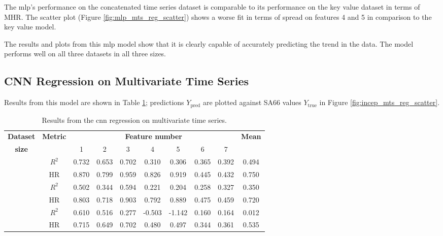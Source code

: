 The \ac{mlp}'s performance on the concatenated time series dataset is comparable to its performance on the key value dataset in terms of MHR. The scatter plot (Figure \ref{fig:mlp_mts_reg_scatter}) shows a worse fit in terms of spread on features 4 and 5 in comparison to the key value model.

The results and plots from this \ac{mlp} model show that it is clearly capable of accurately predicting the trend in the data. The model performs well on all three datasets in all three sizes.

\subsection{CNN Regression on Multivariate Time Series} \label{sec:res:cnn:reg}
Results from this model are shown in Table \ref{tab:inc:lin}; predictions \(Y_{\text{pred}}\) are plotted against SA66 values \(Y_{\text{true}}\) in Figure \ref{fig:incep_mts_reg_scatter}.

\begin{table}
    \renewcommand{\arraystretch}{1.4}
    \begin{center}
        \caption{\label{tab:inc:lin} Results from the \ac{cnn} regression on multivariate time series.}
        \begin{tabular}{ >{\bfseries}c c c c c c c c c c }
            \textbf{Dataset} & \multirow{2}{*}{\textbf{Metric}} & \multicolumn{7}{c}{\textbf{Feature number}} & \multirow{2}{*}{\textbf{Mean}} \\
            size &  & 1 & 2 & 3 & 4 & 5 & 6 & 7 \\
            \midrule
            \multirow{2}{*}{Complete}   & \(R^2\) & 0.732 & 0.653 & 0.702 & 0.310 & 0.306 & 0.365 & 0.392 & 0.494 \\
                                        & HR      & 0.870 & 0.799 & 0.959 & 0.826 & 0.919 & 0.445 & 0.432 & 0.750 \\ \cmidrule{2-10}
            \multirow{2}{*}{Reduced}    & \(R^2\) & 0.502 & 0.344 & 0.594 & 0.221 & 0.204 & 0.258 & 0.327 & 0.350 \\
                                        & HR      & 0.803 & 0.718 & 0.903 & 0.792 & 0.889 & 0.475 & 0.459 & 0.720 \\ \cmidrule{2-10}
            \multirow{2}{*}{Minimal}    & \(R^2\) & 0.610 & 0.516 & 0.277 & -0.503 & -1.142 & 0.160 & 0.164 & 0.012 \\
                                        & HR      & 0.715 & 0.649 & 0.702 & 0.480 & 0.497 & 0.344 & 0.361 & 0.535 \\
        \end{tabular}
    \end{center}
\end{table}

